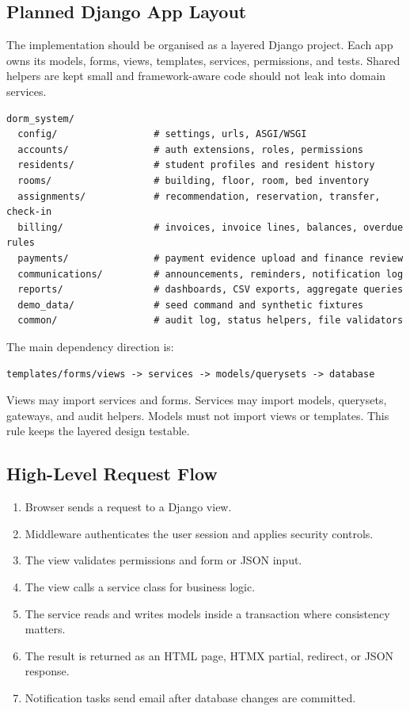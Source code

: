\documentclass[11pt,a4paper]{article}
\begin{document}
\subsection{Planned Django App Layout}
The implementation should be organised as a layered Django project. Each app owns its models, forms, views, templates, services, permissions, and tests. Shared helpers are kept small and framework-aware code should not leak into domain services.

\begin{verbatim}
dorm_system/
  config/                 # settings, urls, ASGI/WSGI
  accounts/               # auth extensions, roles, permissions
  residents/              # student profiles and resident history
  rooms/                  # building, floor, room, bed inventory
  assignments/            # recommendation, reservation, transfer, check-in
  billing/                # invoices, invoice lines, balances, overdue rules
  payments/               # payment evidence upload and finance review
  communications/         # announcements, reminders, notification log
  reports/                # dashboards, CSV exports, aggregate queries
  demo_data/              # seed command and synthetic fixtures
  common/                 # audit log, status helpers, file validators
\end{verbatim}

The main dependency direction is:
\begin{center}
\texttt{templates/forms/views -> services -> models/querysets -> database}
\end{center}
Views may import services and forms. Services may import models, querysets, gateways, and audit helpers. Models must not import views or templates. This rule keeps the layered design testable.

\subsection{High-Level Request Flow}
\begin{enumerate}
  \item Browser sends a request to a Django view.
  \item Middleware authenticates the user session and applies security controls.
  \item The view validates permissions and form or JSON input.
  \item The view calls a service class for business logic.
  \item The service reads and writes models inside a transaction where consistency matters.
  \item The result is returned as an HTML page, HTMX partial, redirect, or JSON response.
  \item Notification tasks send email after database changes are committed.
\end{enumerate}
\end{document}
